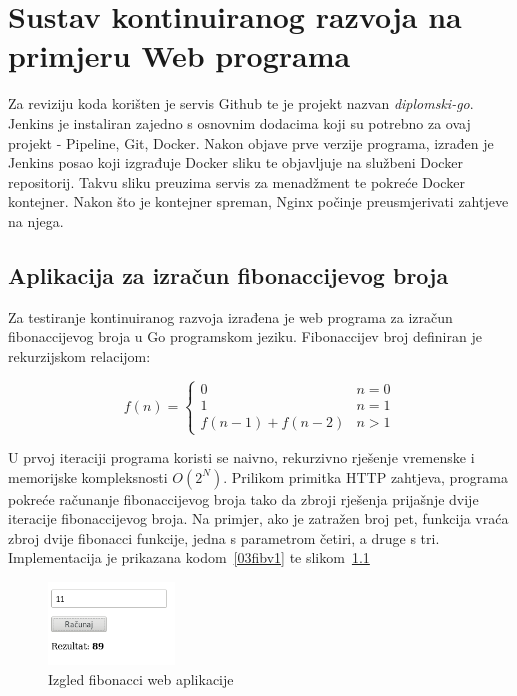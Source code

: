 \chapter{Sustav kontinuiranog razvoja na primjeru Web programa}
Za reviziju koda korišten je servis Github te je projekt nazvan \textit{diplomski-go}. Jenkins je
instaliran zajedno s osnovnim dodacima koji su potrebno za ovaj projekt - Pipeline, Git, Docker.
Nakon objave prve verzije programa, izrađen je Jenkins posao koji izgrađuje Docker sliku te
objavljuje na službeni Docker repositorij. Takvu sliku preuzima servis za menadžment te pokreće
Docker kontejner. Nakon što je kontejner spreman, Nginx počinje preusmjerivati zahtjeve na njega.

\section{Aplikacija za izračun fibonaccijevog broja}
Za testiranje kontinuiranog razvoja izrađena je web programa za izračun fibonaccijevog broja u Go
programskom jeziku. Fibonaccijev broj definiran je rekurzijskom relacijom:

\begin{equation*}
    f(n) = \begin{cases}
               0               & n = 0\\
               1               & n = 1\\
               f(n-1) + f(n-2) & n > 1
           \end{cases}
\end{equation*}

U prvoj iteraciji programa koristi se naivno, rekurzivno rješenje vremenske i memorijske
kompleksnosti $O(2^N)$. Prilikom primitka HTTP zahtjeva, programa pokreće računanje fibonaccijevog
broja tako da zbroji rješenja prijašnje dvije iteracije fibonaccijevog broja. Na primjer, ako je
zatražen broj pet, funkcija vraća zbroj dvije fibonacci funkcije, jedna s parametrom četiri, a druge
s tri. Implementacija je prikazana kodom~\ref{03fibv1} te slikom~\ref{fig:03fibv1png}

\begin{figure}[h]
    \centering
    \includegraphics[width=0.3\textwidth]{img/03/fibonacci_html.png}
    \caption{Izgled fibonacci web aplikacije}%
    \label{fig:03fibv1png}
\end{figure}

